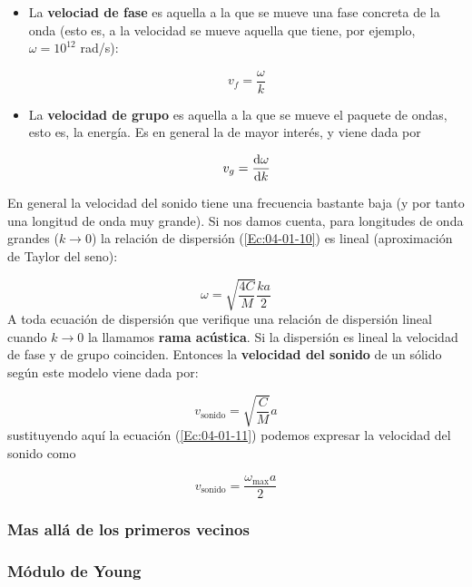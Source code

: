 \begin{itemize}
	\item La \textbf{velociad de fase} es aquella a la que se mueve una fase concreta de la onda (esto es, a la velocidad se mueve aquella que tiene, por ejemplo, $\omega=10^{12}$ rad/s):
	
	\begin{equation}
		v_f = \frac{\omega}{k}
	\end{equation}
	\item La \textbf{velocidad de grupo} es aquella a la que se mueve el paquete de ondas, esto es, la energía. Es en general la de mayor interés, y viene dada por
	
	\begin{equation}
		v_g = \frac{\mathrm{d} \omega}{\mathrm{d} k}
	\end{equation}
\end{itemize}
En general la velocidad del sonido tiene una frecuencia bastante baja (y por tanto una longitud de onda muy grande). Si nos damos cuenta, para longitudes de onda grandes ($k\rightarrow 0$) la relación de dispersión (\ref{Ec:04-01-10}) es lineal (aproximación de Taylor del seno):

\begin{equation}
	\omega = \sqrt{\frac{4C}{M}} \frac{ka}{2}
\end{equation}
A toda ecuación de dispersión que verifique una relación de dispersión lineal cuando $k\rightarrow0$ la llamamos \textbf{rama acústica}. Si la dispersión es lineal la velocidad de fase y de grupo coinciden. Entonces la \textbf{velocidad del sonido} de un sólido según este modelo viene dada por:

\begin{equation}
	v_{\text{sonido}} = \sqrt{\frac{C}{M}} a
\end{equation}
sustituyendo aquí la ecuación (\ref{Ec:04-01-11}) podemos expresar la velocidad del sonido como

\begin{equation}
	v_{\text{sonido}} = \frac{ \omega_{\max} a}{2}
\end{equation}

\subsubsection{Mas allá de los primeros vecinos}

\subsubsection{Módulo de Young}

